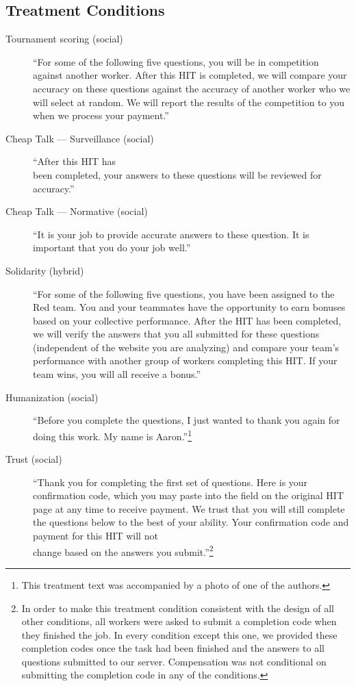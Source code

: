 \documentclass{cscw2010}
\begin{document}
\subsection{Treatment Conditions}

\begin{description}
\item[Tournament scoring (social)] ``For some of the following five questions, you will be in competition against another worker. After this HIT is completed, we will compare your accuracy on these questions against the accuracy of another worker who we will select at random. We will report the results of the competition to you when we process your payment.''

\item[Cheap Talk --- Surveillance (social)] ``After this HIT has\\ been
  completed, your answers to these questions will be reviewed for
  accuracy.''
\item[Cheap Talk --- Normative (social)] ``It is your job to provide
  accurate answers to these question. It is important that you do your
  job well.''
\item[Solidarity (hybrid)] ``For some of the following five questions,
  you have been assigned to the Red team. You and your teammates have
  the opportunity to earn bonuses based on your collective
  performance. After the HIT has been completed, we will verify the
  answers that you all submitted for these questions (independent of
  the website you are analyzing) and compare your team's performance
  with another group of workers completing this HIT. If your team
  wins, you will all receive a bonus.''
\item[Humanization (social)] ``Before you complete the questions, I
  just wanted to thank you again for doing this work. My name is
  Aaron.''\footnote{This treatment text was accompanied by a photo of one of the authors.}
\item[Trust (social)] ``Thank you for completing the first set of
  questions. Here is your confirmation code, which you may paste into
  the field on the original HIT page at any time to receive
  payment. We trust that you will still complete the questions below
  to the best of your ability. Your confirmation code and payment for
  this HIT will not \\change based on the answers you
  submit.''\footnote{In order to make this treatment condition consistent with the design of all other conditions, all workers were asked to submit a completion code when they finished the job. In every condition except this one, we provided these completion codes once the task had been finished and the answers to all questions submitted to our server. Compensation was not conditional on submitting the completion code in any of the conditions.}

\end{description}
\end{document}
